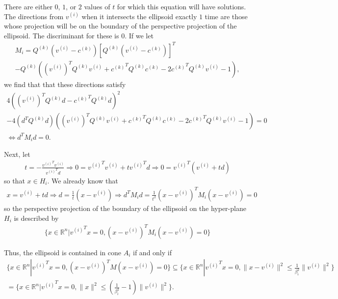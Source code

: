 \documentclass{article}
\theoremstyle{case}
\numberwithin{theorem}{subsection}
\newcommand{\ck}{{c^{(k)}}}
\newcommand{\qk}{{Q^{(k)}}}
\newcommand{\Rn}{\mathbb R^n}
\begin{document}
There are either $0$, $1$, or $2$ values of $t$ for which this equation will have solutions.
The directions from $v^{(i)}$ when it intersects the ellipsoid exactly $1$ time are those whose projection will be on the boundary of the perspective projection of the ellipsoid.
The discriminant for these is $0$.
If we let
\begin{align*}
M_i = 
\qk (v^{(i)} - \ck )\left[\qk (v^{(i)} - \ck )\right]^T \\
- \qk  \left(\left(v^{(i)}\right)^T \qk  v^{(i)} + \ck ^T \qk  \ck  - 2 \ck ^T \qk  v^{(i)} - 1\right),
\end{align*}
we find that that these directions satisfy
\begin{align*}
4\left(\left(v^{(i)}\right)^T \qk  d - \ck ^T\qk d\right)^2 \\
- 4 \left(d^T\qk d\right) \left(\left(v^{(i)}\right)^T \qk  v^{(i)} + \ck ^T \qk  \ck  - 2 \ck ^T \qk  v^{(i)} - 1\right) = 0 \\
\Longleftrightarrow d^TM_id = 0.
\end{align*}


Next, let
\begin{align*}
t = -\frac {{v^{(i)}}^T v^{(i)}}{{v^{(i)}}^T d } \Longrightarrow
0 = {v^{(i)}}^T v^{(i)} + t {v^{(i)}}^T d \Longrightarrow
0 = {v^{(i)}}^T \left(v^{(i)} + t d\right)
\end{align*}
so that $x \in H_i$.
We already know that
\begin{align*}
x = v^{(i)} + t d \Longrightarrow
d = \frac 1 t \left(x - v^{(i)}\right)
\Longrightarrow d^TM_id = \frac 1 {t^2} \left(x - v^{(i)}\right)^TM_i\left(x - v^{(i)}\right) = 0
\end{align*}
so the perspective projection of the boundary of the ellipsoid on the hyper-plane $H_i$ is described by
\begin{align*}
\{x \in \Rn | {v^{(i)}}^Tx = 0, \left(x - v^{(i)}\right)^TM_i\left(x - v^{(i)}\right) = 0\}
\end{align*}

Thus, the ellipsoid is contained in cone $A_i$ if and only if
\begin{align*}
\{x \in \Rn | {v^{(i)}}^Tx = 0, \left(x - v^{(i)}\right)^TM\left(x - v^{(i)}\right) = 0\}
\subseteq \{x \in \Rn | {v^{(i)}}^Tx = 0, \|x - v^{(i)}\|^2 \le \frac 1 {\beta_i^2}\|v^{(i)}\|^2 \} \\
= \{x \in \Rn | {v^{(i)}}^Tx = 0, \|x\|^2 \le \left(\frac 1 {\beta_i^2} - 1\right)\|v^{(i)}\|^2 \}.
\end{align*}
\end{document}
